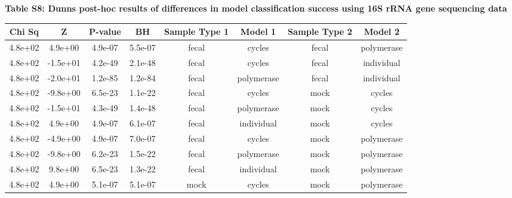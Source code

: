 \documentclass[11pt,]{article}
\begin{document}
\normalsize

\newpage

\textbf{Table S8: Dunns post-hoc results of differences in model
classification success using 16S rRNA gene sequencing data}

\begin{longtable}[]{@{}cccccccc@{}}
\toprule
Chi Sq & Z & P-value & BH & Sample Type 1 & Model 1 & Sample Type 2 &
Model 2\tabularnewline
\midrule
\endhead
4.8e+02 & 4.9e+00 & 4.9e-07 & 5.5e-07 & fecal & cycles & fecal &
polymerase\tabularnewline
4.8e+02 & -1.5e+01 & 4.2e-49 & 2.1e-48 & fecal & cycles & fecal &
individual\tabularnewline
4.8e+02 & -2.0e+01 & 1.2e-85 & 1.2e-84 & fecal & polymerase & fecal &
individual\tabularnewline
4.8e+02 & -9.8e+00 & 6.5e-23 & 1.1e-22 & fecal & cycles & mock &
cycles\tabularnewline
4.8e+02 & -1.5e+01 & 4.3e-49 & 1.4e-48 & fecal & polymerase & mock &
cycles\tabularnewline
4.8e+02 & 4.9e+00 & 4.9e-07 & 6.1e-07 & fecal & individual & mock &
cycles\tabularnewline
4.8e+02 & -4.9e+00 & 4.9e-07 & 7.0e-07 & fecal & cycles & mock &
polymerase\tabularnewline
4.8e+02 & -9.8e+00 & 6.2e-23 & 1.5e-22 & fecal & polymerase & mock &
polymerase\tabularnewline
4.8e+02 & 9.8e+00 & 6.5e-23 & 1.3e-22 & fecal & individual & mock &
polymerase\tabularnewline
4.8e+02 & 4.9e+00 & 5.1e-07 & 5.1e-07 & mock & cycles & mock &
polymerase\tabularnewline
\bottomrule
\end{longtable}

\newpage
\end{document}
